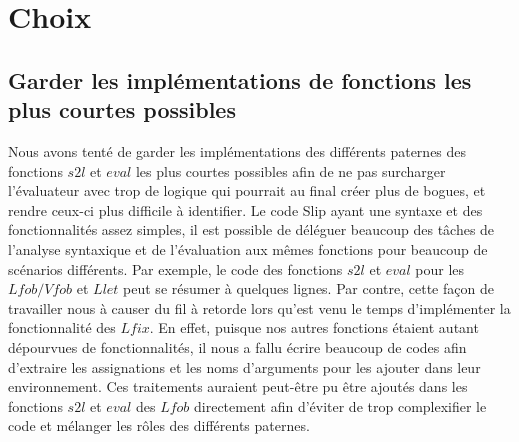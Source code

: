 \documentclass{article}
\begin{document}
	\section{Choix}

	\subsection{Garder les implémentations de fonctions les plus courtes possibles}

	Nous avons tenté de garder les implémentations des différents paternes des
	fonctions $s2l$ et $eval$ les plus courtes possibles afin de ne pas surcharger l'évaluateur
	avec trop de logique qui pourrait au final créer plus de bogues, et rendre ceux-ci
	plus difficile à identifier. Le code Slip ayant une syntaxe et des
	fonctionnalités assez simples, il est possible de déléguer beaucoup des tâches de
	l'analyse syntaxique et de l'évaluation aux mêmes fonctions pour beaucoup de scénarios
	différents. Par exemple, le code des fonctions $s2l$ et $eval$ pour les $Lfob/V
	fob$ et $Llet$ peut se résumer à quelques lignes. Par contre, cette façon de
	travailler nous à causer du fil à retorde lors qu’est venu le temps d'implémenter
	la fonctionnalité des $Lfix$. En effet, puisque nos autres fonctions étaient autant
	dépourvues de fonctionnalités, il nous a fallu écrire beaucoup de codes afin d'extraire
	les assignations et les noms d'arguments pour les ajouter dans leur
	environnement. Ces traitements auraient peut-être pu être ajoutés dans les fonctions
	$s2l$ et $eval$ des $Lfob$ directement afin d'éviter de trop complexifier le code
	et mélanger les rôles des différents paternes.
\end{document}
